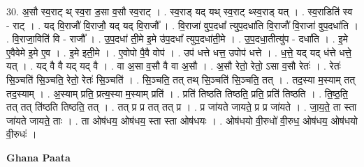 \documentclass[17pt]{extarticle}
\begin{document}
30. अ॒सौ स्व॒राट् थ् स्व॒रा ड॒सा व॒सौ स्व॒राट् । . स्व॒राड् यद् यथ् स्व॒राट् थ्स्व॒राड् यत् । . स्व॒राडिति॑ स्व - राट् । . यद् वि॒राजौ॑ वि॒राजौ॒ यद् यद् वि॒राजौ᳚ । . वि॒राजा॑ वुप॒दधा᳚ त्युप॒दधा॑ति वि॒राजौ॑ वि॒राजा॑ वुप॒दधा॑ति । . वि॒राजा॒विति॑ वि - राजौ᳚ । . उ॒प॒दधा॑ ती॒मे इ॒मे उ॑प॒दधा᳚ त्युप॒दधा॑ती॒मे । . उ॒प॒दधा॒तीत्यु॑प - दधा॑ति । . इ॒मे ए॒वैवेमे इ॒मे ए॒व । . इ॒मे इती॒मे । . ए॒वोपो पै॒वै वोप॑ । . उप॑ धत्ते धत्त॒ उपोप॑ धत्ते । . ध॒त्ते॒ यद् यद् ध॑त्ते धत्ते॒ यत् । . यद् वै वै यद् यद् वै । . वा अ॒सा व॒सौ वै वा अ॒सौ । . अ॒सौ रेतो॒ रेतो॒ ऽसा व॒सौ रेतः॑ । . रेतः॑ सि॒ञ्चति॑ सि॒ञ्चति॒ रेतो॒ रेतः॑ सि॒ञ्चति॑ । . सि॒ञ्चति॒ तत् तथ् सि॒ञ्चति॑ सि॒ञ्चति॒ तत् । . तद॒स्या म॒स्याम् तत् तद॒स्याम् । . अ॒स्याम् प्रति॒ प्रत्य॒स्या म॒स्याम् प्रति॑ । . प्रति॑ तिष्ठति तिष्ठति॒ प्रति॒ प्रति॑ तिष्ठति । . ति॒ष्ठ॒ति॒ तत् तत् ति॑ष्ठति तिष्ठति॒ तत् । . तत् प्र प्र तत् तत् प्र । . प्र जा॑यते जायते॒ प्र प्र जा॑यते । . जा॒य॒ते॒ ता स्ता जा॑यते जायते॒ ताः । . ता ओष॑धय॒ ओष॑धय॒ स्ता स्ता ओष॑धयः । . ओष॑धयो वी॒रुधो॑ वी॒रुध॒ ओष॑धय॒ ओष॑धयो वी॒रुधः॑ । \newline

\textbf{Ghana Paata } \newline
\end{document}
